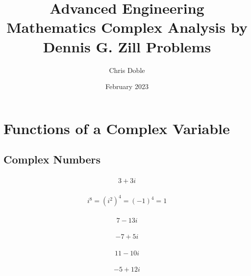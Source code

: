 \documentclass{article}
\title{Advanced Engineering Mathematics Complex Analysis by Dennis G. Zill Problems}
\author{Chris Doble}
\date{February 2023}
\begin{document}
\maketitle

\tableofcontents

\setcounter{section}{16}
\section{Functions of a Complex Variable}

\subsection{Complex Numbers}

\subsubsection{}

\[3 + 3 i\]

\setcounter{subsubsection}{2}
\subsubsection{}

\[i^8 = (i^2)^4 = (-1)^4 = 1\]

\setcounter{subsubsection}{4}
\subsubsection{}

\[7 - 13 i\]

\setcounter{subsubsection}{6}
\subsubsection{}

\[-7 + 5 i\]

\setcounter{subsubsection}{8}
\subsubsection{}

\[11 - 10 i\]

\setcounter{subsubsection}{10}
\subsubsection{}

\[-5 + 12 i\]

\setcounter{subsubsection}{12}
\end{document}
